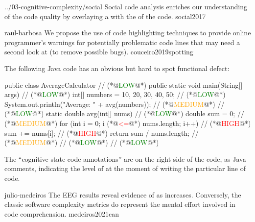 \documentclass{article}
\begin{document}

\lnQuote
  {../03-cognitive-complexity/social}
  {Social code analysis enriches our understanding of the code quality by overlaying a  with the  of the code.}
  {social2017}


\lnQuote
  {raul-barbosa}
  {We propose the use of  code highlighting techniques to provide online programmer's warnings for potentially problematic code lines that may need a second look at (to remove possible bugs).}
  {couceiro2019spotting}

The following Java code has an obvious but hard to spot functional defect:
\par
{\scriptsize\begin{ffcode}[columns=flexible]
public class AverageCalculator {                             // (*@\textcolor{green}{LOW}@*)
  public static void main(String[] args) {                   // (*@\textcolor{green}{LOW}@*)
    int[] numbers = {10, 20, 30, 40, 50};                    // (*@\textcolor{green}{LOW}@*)
    System.out.println("Average: " + avg(numbers));          // (*@\textcolor{orange}{MEDIUM}@*)
  }                                                          // (*@\textcolor{green}{LOW}@*)
  static double avg(int[] nums) {                            // (*@\textcolor{green}{LOW}@*)
    double sum = 0;                                          // (*@\textcolor{orange}{MEDIUM}@*)
    for (int i = 0; i (*@\textcolor{red}{<=}@*) nums.length; i++)                   // (*@\textcolor{red}{HIGH}@*)
      sum += nums[i];                                        // (*@\textcolor{red}{HIGH}@*)
    return sum / nums.length;                                // (*@\textcolor{orange}{MEDIUM}@*)
  }                                                          // (*@\textcolor{green}{LOW}@*)
}                                                            // (*@\textcolor{green}{LOW}@*)
\end{ffcode}
}
\par
The ``cognitive state code annotations'' are on the right side of the code, as Java comments, indicating the level of  at the moment of writing the particular line of code.
\plush{}

\lnQuote
  {julio-medeiros}
  {The EEG results reveal evidence of  as  increases. Conversely, the classic software complexity metrics do  represent the mental effort involved in code comprehension.}
  {medeiros2021can}
\end{document}
